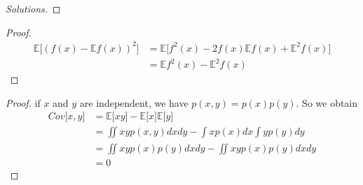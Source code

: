 \documentclass[12pt, a4paper]{article}
\newcommand{\E}{\mathbb{E}}
\newenvironment{exercise}[2][Ex]{\begin{trivlist}
\item[\hskip \labelsep {\bfseries #1}\hskip \labelsep {\bfseries #2.}]}{\end{trivlist}}
\begin{document}
\begin{exercise}{1.4(**)}
    \begin{proof}[Solutions]
        
    \end{proof}
\end{exercise}
\begin{exercise}{1.5(*)}
    \begin{proof}
        \begin{align*}
            \E\lbrack(f(x)-\E f(x))^2\rbrack&=\E\lbrack f^2(x)-2f(x)\E f(x)+\E^2f(x)\rbrack\\
            &=\E f^2(x)-\E^2f(x)
        \end{align*}
    \end{proof}
\end{exercise}
\begin{exercise}{1.6(*)}
    \begin{proof}
        if $x$ and $y$ are independent, we have $p(x,y)=p(x)p(y)$. So we obtain
        \begin{align*}
            Cov\lbrack x,y\rbrack&=\E\lbrack xy\rbrack-\E\lbrack x\rbrack\E\lbrack y\rbrack\\
            &=\iint xyp(x,y)dxdy-\int xp(x)dx\int yp(y)dy\\
            &=\iint xyp(x)p(y)dxdy-\iint xyp(x)p(y)dxdy\\
            &=0
        \end{align*}
    \end{proof}
\end{exercise}
\end{document}
